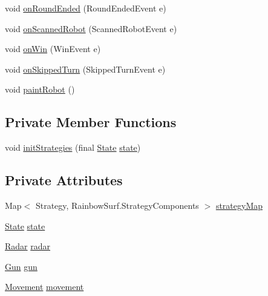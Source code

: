 \begin{DoxyCompactItemize}
\item 
void \hyperlink{classmega_1_1boirlerplate_1_1_rainbow_surf_a94160d0f2eff2c07681c433c14b9790c}{on\+Round\+Ended} (Round\+Ended\+Event e)
\item 
void \hyperlink{classmega_1_1boirlerplate_1_1_rainbow_surf_ab7ea05d81b452a5c1ed1fce2c64e807d}{on\+Scanned\+Robot} (Scanned\+Robot\+Event e)
\item 
void \hyperlink{classmega_1_1boirlerplate_1_1_rainbow_surf_abee1b179e390d1a1127acf576d311f39}{on\+Win} (Win\+Event e)
\item 
void \hyperlink{classmega_1_1boirlerplate_1_1_rainbow_surf_a1e3d82e11b76132839d766a4e2f3a808}{on\+Skipped\+Turn} (Skipped\+Turn\+Event e)
\item 
void \hyperlink{classmega_1_1boirlerplate_1_1_rainbow_surf_a8621b164b044c49190923f851d0dceba}{paint\+Robot} ()
\end{DoxyCompactItemize}
\subsection*{Private Member Functions}
\begin{DoxyCompactItemize}
\item 
void \hyperlink{classmega_1_1boirlerplate_1_1_rainbow_surf_ad4cef06e05fa5e2455028414b99b1eda}{init\+Strategies} (final \hyperlink{classmega_1_1boirlerplate_1_1_state}{State} \hyperlink{classmega_1_1boirlerplate_1_1_rainbow_surf_a13df5a9da5b4480df14c02d36c8a21cb}{state})
\end{DoxyCompactItemize}
\subsection*{Private Attributes}
\begin{DoxyCompactItemize}
\item 
Map$<$ Strategy, Rainbow\+Surf.\+Strategy\+Components $>$ \hyperlink{classmega_1_1boirlerplate_1_1_rainbow_surf_a2581b1a2d2965d9def227a8f8eb410d3}{strategy\+Map}
\item 
\hyperlink{classmega_1_1boirlerplate_1_1_state}{State} \hyperlink{classmega_1_1boirlerplate_1_1_rainbow_surf_a13df5a9da5b4480df14c02d36c8a21cb}{state}
\item 
\hyperlink{classmega_1_1boirlerplate_1_1_radar}{Radar} \hyperlink{classmega_1_1boirlerplate_1_1_rainbow_surf_abb5310cdb4086dcbf43b4a0c51055ba2}{radar}
\item 
\hyperlink{classmega_1_1boirlerplate_1_1_gun}{Gun} \hyperlink{classmega_1_1boirlerplate_1_1_rainbow_surf_a5d5324e094dc3d566c8125280299853f}{gun}
\item 
\hyperlink{classmega_1_1boirlerplate_1_1_movement}{Movement} \hyperlink{classmega_1_1boirlerplate_1_1_rainbow_surf_ac2a284ce071f11b1eb3e6433f7e74d4b}{movement}
\end{DoxyCompactItemize}


